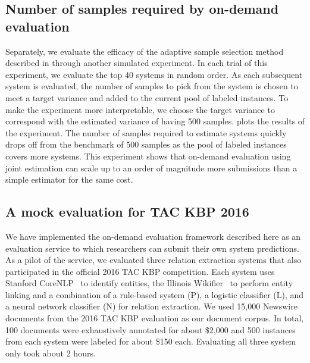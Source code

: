 \subsection{Number of samples required by on-demand evaluation}
Separately, we evaluate the efficacy of the adaptive sample selection method described in  through another simulated experiment.
In each trial of this experiment, we evaluate the top 40 systems in random order.
As each subsequent system is evaluated, the number of samples to pick from the system is chosen to meet a target variance and added to the current pool of labeled instances.
To make the experiment more interpretable, we choose the target variance to correspond with the estimated variance of having 500 samples.
 plots the results of the experiment.
The number of samples required to estimate systems quickly drops off from the benchmark of 500 samples as the pool of labeled instances covers more systems.
This experiment shows that on-demand evaluation using joint estimation can scale up to an order of magnitude more submissions  than a simple estimator for the same cost.

\subsection{A mock evaluation for TAC KBP 2016}
We have implemented the on-demand evaluation framework described here as an evaluation service to which researchers can submit their own system predictions.
As a pilot of the service, we evaluated three relation extraction systems that also participated in the official 2016 TAC KBP competition.
Each system uses Stanford CoreNLP~\citep{manning2014stanford} to identify entities, the Illinois Wikifier~\citep{ratinov2011local} to perform entity linking and a combination of a rule-based system (P), a logistic classifier (L), and a neural network classifier (N) for relation extraction.
We used 15,000 Newswire documents from the 2016 TAC KBP evaluation as our document corpus.
In total, 100 documents were exhaustively annotated for about \$2,000 and 500 instances from each system were labeled for about \$150 each.
Evaluating all three system only took about 2 hours. 


